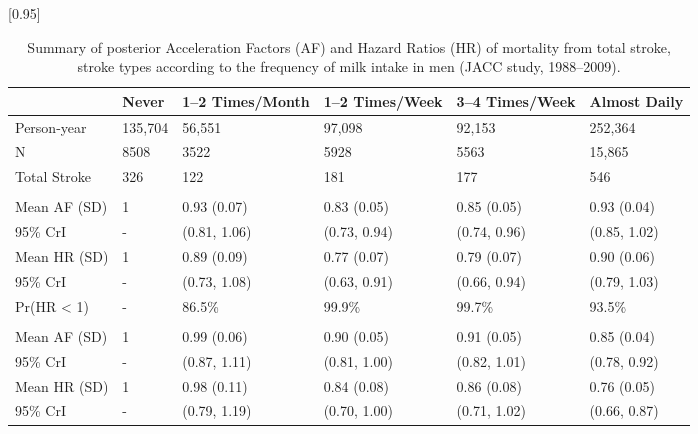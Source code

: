 \documentclass[nutrients,article,accept,moreauthors,pdftex]{Definitions/mdpi}
\begin{document}
\begin{table}[H]

\caption{\label{tab:tab2}Summary of posterior Acceleration Factors (AF) and Hazard Ratios (HR) of mortality from total stroke, stroke types according to the frequency of milk intake in men (JACC study, 1988--2009).}
\centering

\scalebox{.95}[0.95]{\begin{tabular}{L{32mm}C{8mm}C{26mm}C{25mm}C{25mm}C{20mm}}
\textbf{ } & \textbf{Never} & \textbf{1--2 Times/Month} & \textbf{1--2 Times/Week} & \textbf{3--4 Times/Week} & \textbf{Almost Daily}\\
\hline
   Person-year & 135,704 & 56,551 & 97,098 & 92,153 & 252,364\\
N & 8508 & 3522 & 5928 & 5563 & 15,865\\
   Total Stroke & 326 & 122 & 181 & 177 & 546\\
\addlinespace[0.3em]
\\
\hspace{1em}Mean AF (SD) & 1 & 0.93 (0.07) & 0.83 (0.05) & 0.85 (0.05) & 0.93 (0.04)\\
   \hspace{1em}95\% CrI & - & (0.81, 1.06) & (0.73, 0.94) & (0.74, 0.96) & (0.85, 1.02)\\
\hspace{1em}Mean HR (SD) & 1 & 0.89 (0.09) & 0.77 (0.07) & 0.79 (0.07) & 0.90 (0.06)\\
   \hspace{1em}95\% CrI & - & (0.73, 1.08) & (0.63, 0.91) & (0.66, 0.94) & (0.79, 1.03)\\
\hspace{1em}Pr(HR < 1) & - & 86.5\% & 99.9\% & 99.7\% & 93.5\%\\
\addlinespace[0.3em]
\\
   \hspace{1em}Mean AF (SD) & 1 & 0.99 (0.06) & 0.90 (0.05) & 0.91 (0.05) & 0.85 (0.04)\\
\hspace{1em}95\% CrI & - & (0.87, 1.11) & (0.81, 1.00) & (0.82, 1.01) & (0.78, 0.92)\\
   \hspace{1em}Mean HR (SD) & 1 & 0.98 (0.11) & 0.84 (0.08) & 0.86 (0.08) & 0.76 (0.05)\\
\hspace{1em}95\% CrI & - & (0.79, 1.19) & (0.70, 1.00) & (0.71, 1.02) & (0.66, 0.87)\\

\end{tabular}}
\end{table}
\end{document}
